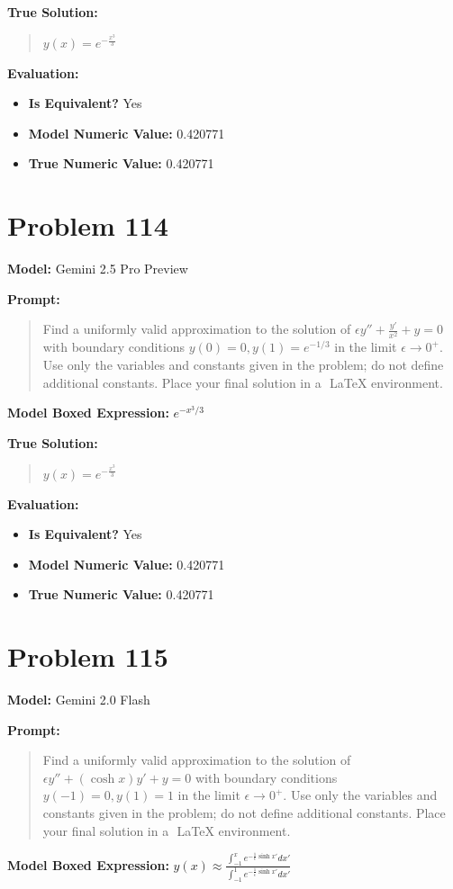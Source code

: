 \documentclass{article}
\begin{document}
{\textbf{True Solution:}
\begin{quote}
$y(x)=e^{-\frac{x^3}{3}}$
\end{quote}

\textbf{Evaluation:}
\begin{itemize}
\item \textbf{Is Equivalent?} Yes
\item \textbf{Model Numeric Value:} 0.420771
\item \textbf{True Numeric Value:} 0.420771
\end{itemize}
\vspace{1cm}
\section*{Problem 114}
\textbf{Model:} Gemini 2.5 Pro Preview

\textbf{Prompt:}
\begin{quote}
Find a uniformly valid approximation to the solution of $\epsilon y'' + \frac{y'}{x^2} + y = 0$ with boundary conditions $y(0) = 0, y(1) = e^{-1/3}$ in the limit $\epsilon \to 0^+$. Use only the variables and constants given in the problem; do not define additional constants. Place your final solution in a $\boxed{}$ LaTeX environment.
\end{quote}
\textbf{Model Boxed Expression:} $e^{-x^3/3}$

\textbf{True Solution:}
\begin{quote}
$y(x)=e^{-\frac{x^3}{3}}$
\end{quote}

\textbf{Evaluation:}
\begin{itemize}
\item \textbf{Is Equivalent?} Yes
\item \textbf{Model Numeric Value:} 0.420771
\item \textbf{True Numeric Value:} 0.420771
\end{itemize}
\vspace{1cm}
\section*{Problem 115}
\textbf{Model:} Gemini 2.0 Flash

\textbf{Prompt:}
\begin{quote}
Find a uniformly valid approximation to the solution of $\epsilon y'' + (\cosh x)y' + y = 0$ with boundary conditions $y(-1) = 0, y(1) = 1$ in the limit $\epsilon \to 0^+$. Use only the variables and constants given in the problem; do not define additional constants. Place your final solution in a $\boxed{}$ LaTeX environment.
\end{quote}
\textbf{Model Boxed Expression:} $y(x) \approx \frac{\int_{-1}^x e^{-\frac{1}{\epsilon}\sinh x'} dx'}{\int_{-1}^1 e^{-\frac{1}{\epsilon}\sinh x'} dx'}$

}
\end{document}
